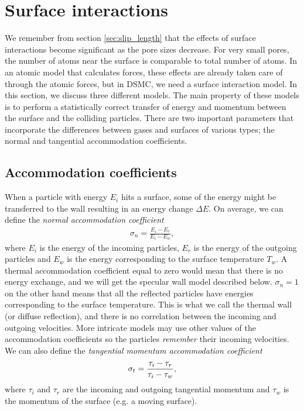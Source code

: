 \section{Surface interactions}
\label{sec:surface_interactions}
We remember from section \ref{sec:slip_length} that the effects of surface interactions become significant as the pore sizes decrease. For very small pores, the number of atoms near the surface is comparable to total number of atoms. In an atomic model that calculates forces, these effects are already taken care of through the atomic forces, but in DSMC, we need a surface interaction model. In this section, we discuss three different models. The main property of these models is to perform a statistically correct transfer of energy and momentum between the surface and the colliding particles. There are two important parameters that incorporate the differences between gases and surfaces of various types; the normal and tangential accommodation coefficients.
\subsection{Accommodation coefficients}
\label{sec:accomodation_coefficients}
When a particle with energy $E_i$ hits a surface, some of the energy might be transferred to the wall resulting in an energy change $\Delta E$. On average, we can define the \textit{normal accommodation coefficient} 
\begin{align}
	\sigma_n = \frac{E_i - E_r}{E_i - E_w},
\end{align}
where $E_i$ is the energy of the incoming particles, $E_r$ is the energy of the outgoing particles and $E_w$ is the energy corresponding to the surface temperature $T_w$. A thermal accommodation coefficient equal to zero would mean that there is no energy exchange, and we will get the specular wall model described below. $\sigma_n=1$ on the other hand means that all the reflected particles have energies corresponding to the surface temperature. This is what we call the thermal wall (or diffuse reflection\cite{karniadakis2005microflows}), and there is no correlation between the incoming and outgoing velocities. More intricate models may use other values of the accommodation coefficients so the particles \textit{remember} their incoming velocities. We can also define the \textit{tangential momentum accommodation coefficient}
\begin{align}
	\sigma_t = {\tau_i - \tau_r\over \tau_i - \tau_w},
\end{align}
where $\tau_i$ and $\tau_r$ are the incoming and outgoing tangential momentum and $\tau_w$ is the momentum of the surface (e.g. a moving surface). 

